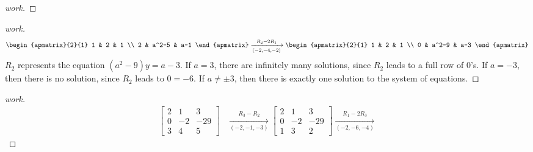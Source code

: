 \documentclass{article}
\begin{document}
\begin{enumerate}
\begin{proof}[work]
    \end{proof}
    \begin{proof}[work]
        \begin{align*}
            \begin{apmatrix}{2}{1}
                1 & 2     & 1 \\
                2 & a^2-5 & a-1
            \end{apmatrix} \xrightarrow[(-2,-4,-2)]{R_2 - 2R_1}
            \begin{apmatrix}{2}{1}
                1 & 2     & 1 \\
                0 & a^2-9 & a-3
            \end{apmatrix}
        \end{align*}
        $R_2$ represents the equation $(a^2-9)y = a-3$. If $a = 3$, there are infinitely many solutions, since $R_2$ leads to a full row of $0$'s. If $a = -3$, then there is no solution, since $R_2$ leads to $0 = -6$. If $a \neq \pm 3$, then there is exactly one solution to the system of equations.
    \end{proof}
    \begin{proof}[work]
        \begin{align*}
            \begin{bmatrix}
                2 & 1  & 3   \\
                0 & -2 & -29 \\
                3 & 4  & 5
            \end{bmatrix} & \xrightarrow[(-2,-1,-3)]{R_3 - R_2}
            \begin{bmatrix}
                2 & 1  & 3   \\
                0 & -2 & -29 \\
                1 & 3  & 2
            \end{bmatrix} \xrightarrow[(-2,-6,-4)]{R_1 - 2R_3}

\end{align*}
\end{proof}
\end{enumerate}
\end{document}

